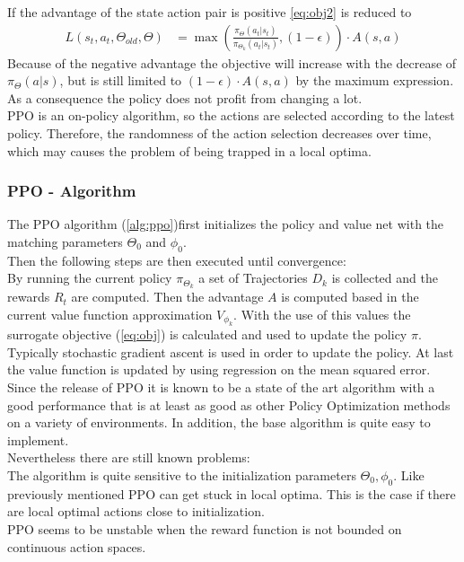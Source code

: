 If the advantage of the state action pair is positive \cref{eq:obj2} is reduced to 
\begin{align}
	L(s_t, a_t, \Theta_{old}, \Theta) &= \max (\frac{\pi_{\Theta}(a_t|s_t)}{\pi_{\Theta_k}(a_t|s_t)}, (1 - \epsilon)) \cdot A(s,a)
\end{align}
Because of the negative advantage the objective will increase with the decrease of $\pi_{\Theta} (a|s)$, but is still limited to $(1 - \epsilon) \cdot A(s,a)$ by the maximum expression.\\
As a consequence the policy does not profit from changing a lot.\\
PPO is an on-policy algorithm, so the actions are selected according to the latest policy. Therefore, the randomness of the action selection decreases over time, which may causes the problem of being trapped in a local optima.

\newpage
\subsubsection{PPO - Algorithm}
The PPO algorithm (\cref{alg:ppo})first initializes the policy and value net with the matching parameters $\Theta_0$ and $\phi_0$.\\
Then the following steps are then executed until convergence:\\
By running the current policy $\pi_{\Theta_k}$ a set of Trajectories $D_k$ is collected and the rewards $R_t$ are computed. Then the advantage $A$ is computed based in the current value function approximation $V_{\phi_k}$. With the use of this values the surrogate objective (\cref{eq:obj}) is calculated and used to update the policy $\pi$. Typically stochastic gradient ascent is used in order to update the policy. At last the value function is updated by using regression on the mean squared error.\\
\newline
Since the release of PPO it is known to be a state of the art algorithm with a good performance that is at least as good as other Policy Optimization methods on a variety of environments. In addition, the base algorithm is quite easy to implement.\\
Nevertheless there are still known problems:\\
The algorithm is quite sensitive to the initialization parameters $\Theta_0, \phi_0$. Like previously mentioned PPO can get stuck in local optima. This is the case if there are local optimal actions close to initialization.\\
PPO seems to be unstable when the reward function is not bounded on continuous action spaces. 


